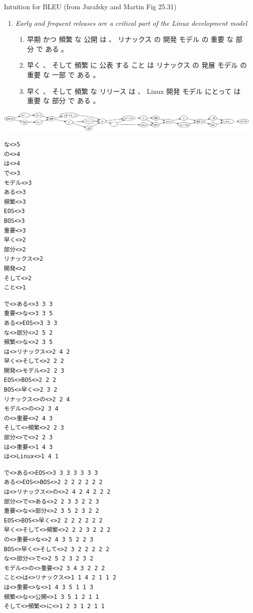 \documentclass[a4paper,landscape,headrule,footrule,dvips]{foils}
\begin{document}
\begin{CJK}{UTF8}{min}
  \begin{center}
    Intuition for BLEU (from Jurafsky and Martin Fig 25.31)
  \end{center}


\begin{enumerate}
\item \textit{Early and frequent releases are a critical part of the Linux development model}
  \begin{enumerate}
  \item 早期 かつ 頻繁 な 公開 は 、 リナックス の 開発 モデル の 重要 な 部分 で ある 。%
  \item 早く 、 そして 頻繁 に 公表 する こと は リナックス の 発展 モデル の 重要 な 一部 で ある 。 %
  \item 早く 、 そして 頻繁 な リリース は 、 Linux 開発 モデル にとって は 重要 な 部分 で ある 。 %
  \end{enumerate}
\end{enumerate}

\hspace{-20mm}\includegraphics[width=1.2\textwidth]{include/lattice-24.eps}

\begin{small}
\begin{verbatim}
な<>5 
の<>4 
は<>4 
で<>3 
モデル<>3 
ある<>3 
頻繁<>3 
EOS<>3 
BOS<>3 
重要<>3 
早く<>2 
部分<>2 
リナックス<>2 
開発<>2 
そして<>2 
こと<>1 
\end{verbatim}
\end{small}


\begin{small}
\begin{verbatim}
で<>ある<>3 3 3 
重要<>な<>3 3 5 
ある<>EOS<>3 3 3 
な<>部分<>2 5 2 
頻繁<>な<>2 3 5 
は<>リナックス<>2 4 2 
早く<>そして<>2 2 2 
開発<>モデル<>2 2 3 
EOS<>BOS<>2 2 2 
BOS<>早く<>2 3 2 
リナックス<>の<>2 2 4 
モデル<>の<>2 3 4 
の<>重要<>2 4 3 
そして<>頻繁<>2 2 3 
部分<>で<>2 2 3 
は<>重要<>1 4 3 
は<>Linux<>1 4 1 
\end{verbatim}
\end{small}

\begin{small}
\begin{verbatim}
で<>ある<>EOS<>3 3 3 3 3 3 3 
ある<>EOS<>BOS<>2 2 2 2 2 2 2 
は<>リナックス<>の<>2 4 2 4 2 2 2 
部分<>で<>ある<>2 2 3 3 2 2 3 
重要<>な<>部分<>2 3 5 2 3 2 2 
EOS<>BOS<>早く<>2 2 2 2 2 2 2 
早く<>そして<>頻繁<>2 2 2 3 2 2 2 
の<>重要<>な<>2 4 3 5 2 2 3 
BOS<>早く<>そして<>2 3 2 2 2 2 2 
な<>部分<>で<>2 5 2 3 2 3 2 
モデル<>の<>重要<>2 3 4 3 2 2 2 
こと<>は<>リナックス<>1 1 4 2 1 1 2 
は<>重要<>な<>1 4 3 5 1 1 3 
頻繁<>な<>公開<>1 3 5 1 2 1 1 
そして<>頻繁<>に<>1 2 3 1 2 1 1 
\end{verbatim}
\end{small}


\end{CJK}
\end{document}

